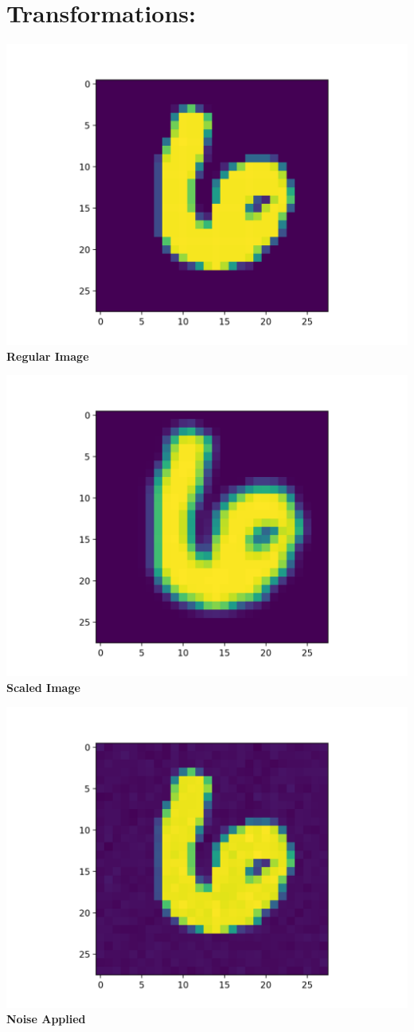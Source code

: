 \documentclass[12pt, letterpaper, notitlepage, twoside]{article}
\theoremstyle{definition}
\theoremstyle{plain}
\begin{document}
\section{Transformations:}
\begin{center}
    \includegraphics{Imgs/6.png}
    \textbf{Regular Image}

    \includegraphics{Imgs/6_big.png}
    \textbf{Scaled Image}

    \includegraphics{Imgs/6_noise.png}
    \textbf{Noise Applied}


\end{center}
\end{document}
